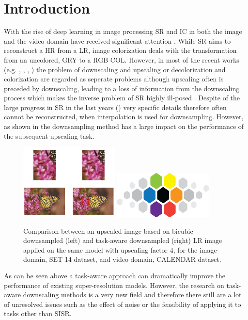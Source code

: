 \newpage
\section{Introduction}
\label{sec:Introduction}
With the rise of deep learning in image processing \ac{SR} and \ac{IC}
in both the image and the video domain have received significant
attention \cite{DLFISRAS}. While SR aims to reconstruct a \ac{HR} from a
\ac{LR}, image colorization deals with the transformation from an uncolored,
\ac{GRY} to a RGB \ac{COL}.
However, in most of the recent works (e.g. \cite{AFPATSISR}, \cite{ESRGAN},
\cite{RBPNFVSR}, \cite{LFVSRTHROFE}) the problem of downscaling and upscaling
or decolorization and colorization are regarded as seperate problems although
upscaling often is preceded by downscaling, leading to a loss of information
from the downscaling process which makes the inverse problem of SR highly
ill-posed \cite{TAID}. Despite of the large progress in SR in the last years
(\cite{DLFISRAS}) very specific details therefore often cannot be reconstructed,
when interpolation is used for downsampling. However, as shown in
 the downsampling method has a large impact on
the performance of the subsequent upscaling task.

\begin{figure}[!htbp]
\centering
\includegraphics[width=5cm]{figures/shrb_vs_shrt_x4}
\includegraphics[width=5cm]{figures/cvl}
\caption{Comparison between an upscaled image based on bicubic downsampled
(left) and task-aware downsampled (right) LR image applied on the same model
with upscaling factor 4, for the image-domain, SET 14 dataset, and video
domain, CALENDAR dataset.}
\label{fig:shrb_vs_shrt_x4}
\end{figure}

As can be seen above a task-aware approach can dramatically improve the
performance of existing super-resolution models. However, the research on task-
aware downscaling methods is a very new field and therefore there still are
a lot of unresolved issues such as the effect of noise or the feasibility of
applying it to tasks other than \ac{SISR}.

